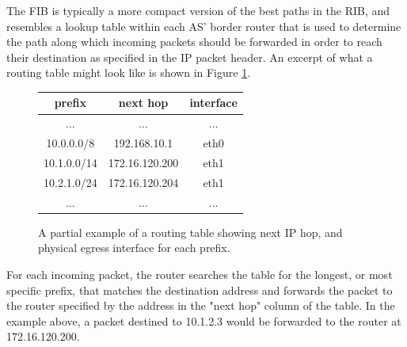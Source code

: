The FIB is typically a more compact version of the best paths in the RIB, and resembles a lookup table within each AS' border router that is used to determine the path along which incoming packets should be forwarded in order to reach their destination as specified in the IP packet header. An excerpt of what a routing table might look like is shown in Figure \ref{fig:ex_routing_table}.

\begin{figure}[h!]
    \begin{center}
    \begin{singlespace}
        \begin{tabular}{c | c | c}
            prefix & next hop & interface \\
            \hline
            ... & ... & ... \\
            10.0.0.0/8  & 192.168.10.1   & eth0 \\
            10.1.0.0/14 & 172.16.120.200 & eth1 \\
            10.2.1.0/24 & 172.16.120.204 & eth1 \\
            ... & ... & ...
        \end{tabular}
    \end{singlespace}
    \end{center}
\caption[A partial example of a routing table]{A partial example of a routing table showing next IP hop, and physical egress interface for each prefix.}
\label{fig:ex_routing_table}
\end{figure}

For each incoming packet, the router searches the table for the longest, or most specific prefix, that matches the destination address and forwards the packet to the router specified by the address in the "next hop" column of the table. In the example above, a packet destined to 10.1.2.3 would be forwarded to the router at 172.16.120.200.


